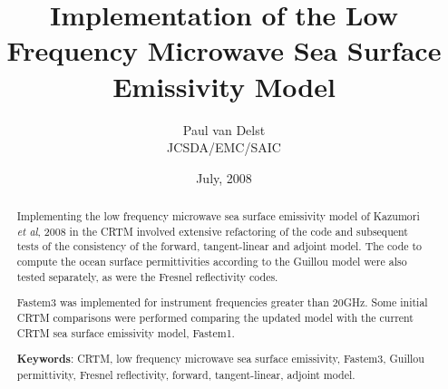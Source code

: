



\newcommand{\rb}[1]{\raisebox{1.5ex}[0pt]{#1}}
\newcommand{\de}{\ensuremath{\delta\epsilon}}
\newcommand{\es}{\ensuremath{\epsilon_{s}}}
\newcommand{\einf}{\ensuremath{\epsilon_{\infty}}}
\newcommand{\eo}{\ensuremath{\epsilon_{0}}}
\newcommand{\twopnt}{\ensuremath{2\pi\nu\tau}}
\newcommand{\dstar}{\ensuremath{\delta^{*}\!}}

\title{Implementation of the Low Frequency Microwave Sea Surface Emissivity Model}
\author{Paul van Delst\\JCSDA/EMC/SAIC}
\date{July, 2008}



\maketitle

\draftwatermark

\begin{abstract}
Implementing the low frequency microwave sea surface emissivity model of Kazumori \textit{et al}, 2008\cite{Kazumori_etal_2008} in the CRTM involved extensive refactoring of the code and subsequent tests of the consistency of the forward, tangent-linear and adjoint model. The code to compute the ocean surface permittivities according to the Guillou\cite{Guillou_etal_1998} model were also tested separately, as were the Fresnel reflectivity codes.

Fastem3 was implemented for instrument frequencies greater than 20GHz. Some initial CRTM comparisons were performed comparing the updated model with the current CRTM sea surface emissivity model, Fastem1.

\textbf{Keywords}: CRTM, low frequency microwave sea surface emissivity, Fastem3, Guillou permittivity, Fresnel reflectivity, forward, tangent-linear, adjoint model.
\end{abstract}




